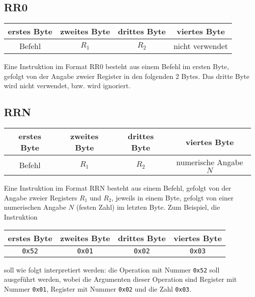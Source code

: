 \subsection{RR0}
\label{RR0}

\begin{center}
  \begin{tabular}{|*{4}{c|}} \hline
    erstes Byte  & zweites Byte  & drittes Byte  & viertes Byte \\\hline\hline
    Befehl       & $R_{1}$       & $R_{2}$ &  nicht verwendet   \\\hline
  \end{tabular}
\end{center}
Eine Instruktion im Format RR0 besteht aus einem Befehl im ersten Byte, gefolgt
von der Angabe zweier Register in den folgenden 2 Bytes.
Das dritte Byte wird nicht verwendet, bzw. wird ignoriert.


\subsection{RRN}
\label{RRN}

\begin{center}
  \begin{tabular}{|*{4}{c|}} \hline
    erstes Byte  & zweites Byte  & drittes Byte  & viertes Byte \\\hline\hline
    Befehl       & $R_{1}$       & $R_{2}$ & numerische Angabe $N$  \\\hline
  \end{tabular}
\end{center}
Eine Instruktion im Format RRN besteht aus einem Befehl, gefolgt von der
Angabe zweier Registers $R_{1}$ und $R_{2}$, jeweils in einem Byte, gefolgt von
einer numerischen Angabe $N$ (festen Zahl) im letzten Byte. Zum Beispiel, die
Instruktion
\begin{center}
  \begin{tabular}{|*{4}{c|}} \hline
    erstes Byte & zweites Byte  & drittes Byte  & viertes Byte \\\hline\hline
    \texttt{0x52} & \texttt{0x01} & \texttt{0x02} & \texttt{0x03} \\\hline
  \end{tabular}
\end{center}
soll wie folgt interpretiert werden: 
die Operation mit Nummer \texttt{0x52} soll ausgeführt werden, wobei die
Argumenten dieser Operation sind Register mit Nummer \texttt{0x01}, Register mit
Nummer \texttt{0x02} und die Zahl \texttt{0x03}.



